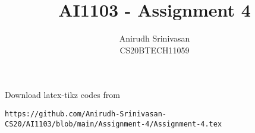 \documentclass[journal,12pt,twocolumn]{IEEEtran}
\DeclareMathOperator*{\Res}{Res}
\begin{document}
\newcommand{\BEQA}{\begin{eqnarray}}
\newcommand{\EEQA}{\end{eqnarray}}
\newcommand{\define}{\stackrel{\triangle}{=}}

\raggedbottom
\setlength{\parindent}{0pt}
\providecommand{\mbf}{\mathbf}
\providecommand{\pr}[1]{\ensuremath{\Pr\left(#1\right)}}
\providecommand{\qfunc}[1]{\ensuremath{Q\left(#1\right)}}
\providecommand{\sbrak}[1]{\ensuremath{{}\left[#1\right]}}
\providecommand{\lsbrak}[1]{\ensuremath{{}\left[#1\right.}}
\providecommand{\rsbrak}[1]{\ensuremath{{}\left.#1\right]}}
\providecommand{\brak}[1]{\ensuremath{\left(#1\right)}}
\providecommand{\lbrak}[1]{\ensuremath{\left(#1\right.}}
\providecommand{\rbrak}[1]{\ensuremath{\left.#1\right)}}
\providecommand{\cbrak}[1]{\ensuremath{\left\{#1\right\}}}
\providecommand{\lcbrak}[1]{\ensuremath{\left\{#1\right.}}
\providecommand{\rcbrak}[1]{\ensuremath{\left.#1\right\}}}
\theoremstyle{remark}
\newtheorem{rem}{Remark}
\newcommand{\sgn}{\mathop{\mathrm{sgn}}}
\newcommand*{\permcomb}[4][0mu]{{{}^{#3}\mkern#1#2_{#4}}}
\newcommand*{\perm}[1][-3mu]{\permcomb[#1]{P}}
\newcommand*{\comb}[1][-1mu]{\permcomb[#1]{C}}
\providecommand{\abs}[1]{\vert#1\vert}
\providecommand{\res}[1]{\Res\displaylimits_{#1}} 
\providecommand{\norm}[1]{\lVert#1\rVert}
\providecommand{\mtx}[1]{\mathbf{#1}}
\providecommand{\mean}[1]{E[ #1 ]}
\providecommand{\fourier}{\overset{\mathcal{F}}{ \rightleftharpoons}}
\providecommand{\system}{\overset{\mathcal{H}}{ \longleftrightarrow}}
\newcommand{\solution}{\noindent \textbf{Solution: }}
\newcommand{\cosec}{\,\text{cosec}\,}
\providecommand{\dec}[2]{\ensuremath{\overset{#1}{\underset{#2}{\gtrless}}}}
\newcommand{\myvec}[1]{\ensuremath{\begin{pmatrix}#1\end{pmatrix}}}
\newcommand{\mydet}[1]{\ensuremath{\begin{vmatrix}#1\end{vmatrix}}}
\makeatletter
{}
\makeatother
\let\StandardTheFigure\thefigure
\let\vec\mathbf
\renewcommand{\thefigure}{\theproblem}
\def\putbox#1#2#3{\makebox[0in][l]{\makebox[#1][l]{}\raisebox{\baselineskip}[0in][0in]{\raisebox{#2}[0in][0in]{#3}}}}
     \def\rightbox#1{\makebox[0in][r]{#1}}
     \def\centbox#1{\makebox[0in]{#1}}
     \def\topbox#1{\raisebox{-\baselineskip}[0in][0in]{#1}}
     \def\midbox#1{\raisebox{-0.5\baselineskip}[0in][0in]{#1}}
\vspace{3cm}
\title{AI1103 - Assignment 4}
\author{Anirudh Srinivasan\\CS20BTECH11059}
\maketitle
\newpage
\bigskip
\renewcommand{\thefigure}{\theenumi}
\renewcommand{\thetable}{\theenumi}
Download latex-tikz codes from 
%
\begin{lstlisting}
https://github.com/Anirudh-Srinivasan-CS20/AI1103/blob/main/Assignment-4/Assignment-4.tex
\end{lstlisting}
\end{document}
